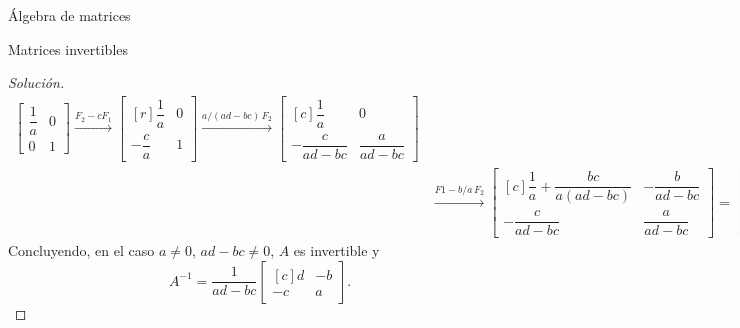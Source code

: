 \begin{chapter}{\'Algebra de matrices}
\begin{section}{Matrices invertibles}
\begin{proof}[Solución]
\begin{align*}
                \begin{bmatrix}\dfrac1a&0\\[8pt]0&1\end{bmatrix} 
                \stackrel{F_2 -cF_1}{\longrightarrow}
                \begin{bmatrix*}[r]\dfrac1a&0\\[8pt]-\dfrac{c}{a}&1\end{bmatrix*}
                \stackrel{a/(ad-bc)\,F_2}{\longrightarrow}
                \begin{bmatrix*}[c]\dfrac1a&0\\[8pt]-\dfrac{c}{ad-bc}&\dfrac{a}{ad-bc}\end{bmatrix*}
                \\& \stackrel{F1-b/a\,F_2}{\longrightarrow}        
                \begin{bmatrix*}[c]\dfrac1a+\dfrac{bc}{a(ad-bc)}&-\dfrac{b}{ad-bc}\\[8pt]-\dfrac{c}{ad-bc}&\dfrac{a}{ad-bc}\end{bmatrix*} 
                =
                \begin{bmatrix*}[c]\dfrac{d}{ad-bc}&-\dfrac{b}{ad-bc}\\[8pt]-\dfrac{c}{ad-bc}&\dfrac{a}{ad-bc}\end{bmatrix*} .
                \end{align*}  
                Concluyendo, en el caso $a\not=0$, $ad-bc\not=0$, $A$  es invertible y 
                \begin{equation}\label{inv-2x2}
                A^{-1} = \dfrac{1}{ad-bc}
                \begin{bmatrix*}[c]d&-b\\-c&a\end{bmatrix*}.
                \end{equation}
                

\end{proof}
\end{section}
\end{chapter}
